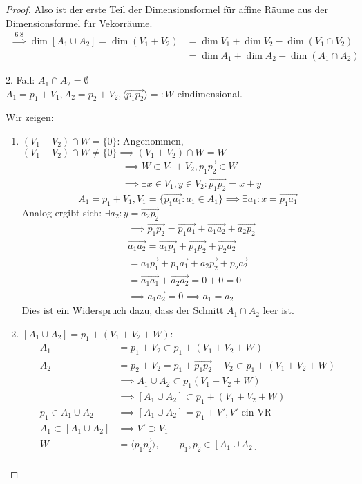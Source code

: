 \documentclass{mycourse}
\begin{document}
\begin{thm}
\begin{proof}
Also ist der erste Teil der Dimensionsformel für affine Räume aus der Dimensionsformel für Vekorräume.
\begin{align*}
 \stackrel{6.8}\implies  \dim[A_1\cup A_2] = \dim(V_1 + V_2)&=\dim V_1+\dim V_2 - \dim(V_1\cap V_2)\\
&=\dim A_1 + \dim A_2 -\dim(A_1\cap A_2)
\end{align*}


2. Fall: $A_1\cap A_2=\emptyset$\\

$A_1=p_1+V_1,A_2=p_2+V_2,\langle\vec{p_1p_2}\rangle=:W$ eindimensional.

Wir zeigen:
\begin{enumerate} %
\item $(V_1+V_2)\cap W=\{0\}$:
Angenommen, $(V_1+V_2)\cap W\neq \{0\} \implies (V_1+V_2)\cap W=W$
\begin{align*}
&\implies W\subset V_1+V_2, \vec{p_1p_2}\in W \\
&\implies \exists x\in V_1, y\in V_2:\vec{p_1p_2}=x+y
\end{align*}
\[
A_1=p_1+V_1, V_1=\{\vec{p_1a_1}:a_1\in A_1\} \implies \exists a_1:x=\vec{p_1a_1}
\]
Analog ergibt sich: $ \exists a_2: y= \vec{a_2p_2}$
\begin{align*}
&\implies \vec{p_1p_2}=\vec{p_1a_1}+\vec{a_1a_2}+\vec{a_2p_2} \\
&\vec{a_1a_2}=\vec{a_1p_1}+\vec{p_1p_2}+\vec{p_2a_2} \\
&=\vec{a_1p_1}+\vec{p_1a_1}+\vec{a_2p_2}+\vec{p_2a_2} \\
&=\vec{a_1a_1}+\vec{a_2a_2}=0+0=0\\
&\implies\vec{a_1a_2}=0 \implies a_1=a_2
\end{align*}
Dies ist ein Widerspruch dazu, dass der Schnitt $A_1 \cap A_2$ leer ist.
\item $[A_1\cup A_2]=p_1+(V_1+V_2+W)$:
\begin{align*}
A_1&=p_1+V_2\subset p_1+(V_1+V_2+W)\\
A_2&=p_2+V_2=p_1+\vec{p_1p_2}+V_2\subset p_1+(V_1+V_2+W)\\
&\implies A_1\cup A_2\subset p_1(V_1+V_2+W)\\
&\implies [A_1\cup A_2]\subset p_1+(V_1+V_2+W)\\
p_1\in{A_1\cup A_2}&\implies[A_1\cup A_2]=p_1+V', V' \text{ ein VR}\\
A_1\subset[A_1\cup A_2] &\implies V'\supset V_1\\
W&=\langle\vec{p_1p_2}\rangle, \qquad p_1,p_2\in[A_1\cup A_2]\\

\end{align*}
\end{enumerate}
\end{proof}
\end{thm}
\end{document}
